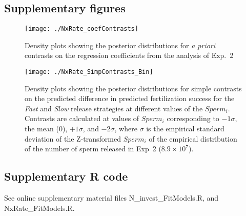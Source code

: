 \documentclass{article}
\newcommand{\code}{\fontfamily{pcr}\selectfont}
\begin{document}
\newpage{}

\subsection*{Supplementary figures}
\renewcommand{\theequation}{S\arabic{equation}}
\setcounter{equation}{0}
\renewcommand{\thefigure}{S\arabic{figure}}
\setcounter{figure}{0}

\begin{figure}[!ht]
\texttt{[image: ./NxRate\_coefContrasts]}
\caption{Density plots showing the posterior distributions for \textit{a priori} contrasts on the regression coefficients from the analysis of Exp.~2}
\label{fig:coefContr}
\end{figure}
\newpage{}



\begin{figure}[!ht]
\texttt{[image: ./NxRate\_SimpContrasts\_Bin]}
\caption{Density plots showing the posterior distributions for simple contrasts on the predicted difference in predicted fertilization success for the \textit{Fast} and \textit{Slow} release strategies at different values of the $Sperm_i$. Contrasts are calculated at values of $Sperm_i$ corresponding to $-1 \sigma$, the mean ($0$), $+1 \sigma$, and $-2 \sigma$, where $\sigma$ is the empirical standard deviation of the Z-transformed $Sperm_i$ of the empirical distribution of the number of sperm released in Exp~2 ($8.9 \times 10^{7}$).
}
\label{fig:simpContr}
\end{figure}
\newpage{}



\subsection*{Supplementary R code}
\renewcommand{\theequation}{S\arabic{equation}}
\setcounter{equation}{0}
\renewcommand{\thefigure}{S\arabic{figure}}
\setcounter{figure}{0}
\renewcommand{\thetable}{S\arabic{table}}
\setcounter{table}{0}

See online supplementary material files {\code N\_invest\_FitModels.R}, and {\code NxRate\_FitModels.R}.
\newpage
\end{document}
